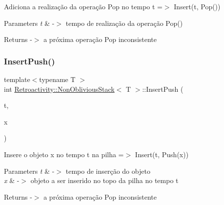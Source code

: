 Adiciona a realização da operação Pop no tempo t =$>$ Insert(t, Pop())


\begin{DoxyParams}{Parameters}
{\em t} & -\/$>$ tempo de realização da operação Pop() \\
\hline
\end{DoxyParams}
\begin{DoxyReturn}{Returns}
-\/$>$ a próxima operação Pop inconsistente 
\end{DoxyReturn}
\mbox{\label{classRetroactivity_1_1NonObliviousStack_a51ae6ac67c430e6456d5dbeecc519ce5}} 
\subsubsection{\texorpdfstring{Insert\+Push()}{InsertPush()}}
{\footnotesize\ttfamily template$<$typename T $>$ \\
int \hyperlink{classRetroactivity_1_1NonObliviousStack}{Retroactivity\+::\+Non\+Oblivious\+Stack}$<$ T $>$\+::Insert\+Push (\begin{DoxyParamCaption}\item[{int}]{t,  }\item[{T}]{x }\end{DoxyParamCaption})}

Insere o objeto x no tempo t na pilha =$>$ Insert(t, Push(x))


\begin{DoxyParams}{Parameters}
{\em t} & -\/$>$ tempo de inserção do objeto \\
\hline
{\em x} & -\/$>$ objeto a ser inserido no topo da pilha no tempo t \\
\hline
\end{DoxyParams}
\begin{DoxyReturn}{Returns}
-\/$>$ a próxima operação Pop inconsistente 
\end{DoxyReturn}
\mbox{\label{classRetroactivity_1_1NonObliviousStack_a3e6f31a8d574a50fa828e90cd43bb64f}} 
